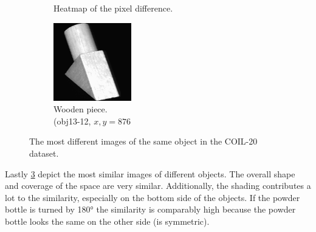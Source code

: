 \begin{figure}[!]
\begin{subfigure}[t]{0.32\columnwidth}
    	\caption{Heatmap of the pixel difference.}
        \label{fig:heatmap_coil20_same}
    \end{subfigure}
     \hfill
     \begin{subfigure}[t]{0.32\columnwidth}
    	\centering
    	\includegraphics[width=\columnwidth]{images/coil-20-proc/obj13__12.png}
    	\caption{Wooden piece. \\ (obj13-12, $x,y=876$}
        \label{fig:obj13__12}
    \end{subfigure}
     \caption[Most Different of Same Object COIL-20 Images]{The most different images of the same object in the COIL-20 dataset.}
    \label{fig:first_most_different_coil}
\end{figure}

Lastly \ref{fig:first_most_different_coil} depict the most similar images of different objects. The overall shape and coverage of the space are very similar. Additionally, the shading contributes a lot to the similarity, especially on the bottom side of the objects. If the powder bottle is turned by 180° the similarity is comparably high because the powder bottle looks the same on the other side (is symmetric). 

